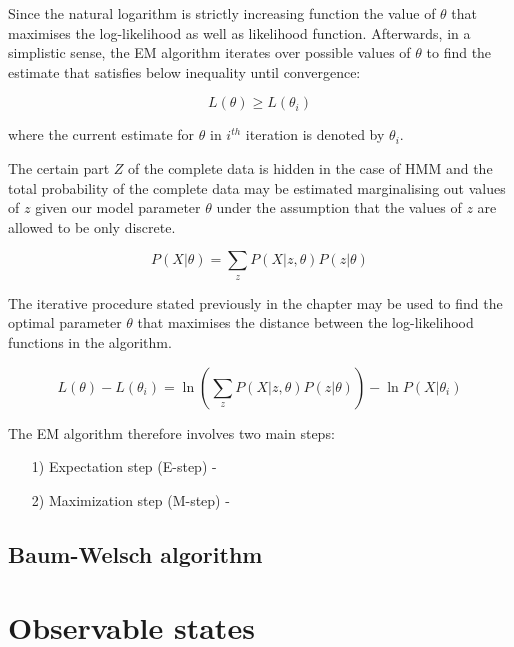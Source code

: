 Since the natural logarithm is strictly increasing function the value of $\theta$ that maximises the log-likelihood as well as likelihood function. Afterwards, in a simplistic sense, the EM algorithm iterates over possible values of $\theta$ to find the estimate that satisfies below inequality until convergence:

\begin{equation}
L(\theta) \geq L(\theta_i)
\end{equation}

where the current estimate for $\theta$ in $i^{th}$ iteration is denoted by $\theta_i$. 

The certain part $Z$ of the complete data is hidden in the case of HMM and the total probability of the complete data may be estimated marginalising out values of $z$ given our model parameter $\theta$ under the assumption that the values of $z$ are allowed to be only discrete. 

\begin{equation}
P(X|\theta) = \sum_z P(X|z,\theta) P(z|\theta)
\end{equation}

The iterative procedure stated previously in the chapter may be used to find the optimal parameter $\theta$ that maximises the distance between the log-likelihood functions in the algorithm. 

\begin{equation}
L(\theta) - L(\theta_i) = \ln (\sum_z P(X|z,\theta) P(z|\theta) ) - \ln P(X|\theta_i)
\end{equation}

The EM algorithm therefore involves two main steps:

\begin{itemize}
\item[1)] Expectation step (E-step) - 
\item[2)] Maximization step (M-step) - 
\end{itemize}



\subsection{Baum-Welsch algorithm}






\section{Observable states}

